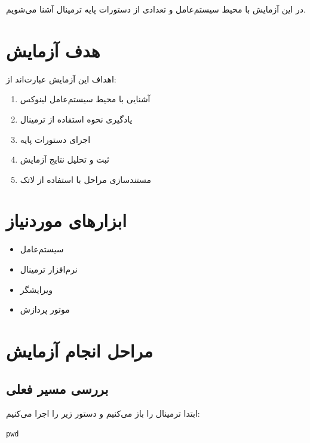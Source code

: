 \documentclass[12pt,a4paper]{article}
\begin{document}
در این آزمایش با محیط سیستم‌عامل
و تعدادی از دستورات پایه ترمینال آشنا می‌شویم.

\section{هدف آزمایش}

اهداف این آزمایش عبارت‌اند از:

\begin{enumerate}
    \item آشنایی با محیط سیستم‌عامل لینوکس
    \item یادگیری نحوه استفاده از ترمینال
    \item اجرای دستورات پایه
    \item ثبت و تحلیل نتایج آزمایش
    \item مستندسازی مراحل با استفاده از لاتک
\end{enumerate}

\section{ابزارهای موردنیاز}

\begin{itemize}
    \item سیستم‌عامل 
    \item نرم‌افزار ترمینال
    \item ویرایشگر 
    \item موتور پردازش 
\end{itemize}

\section{مراحل انجام آزمایش}

\subsection{بررسی مسیر فعلی}

ابتدا ترمینال را باز می‌کنیم و دستور زیر را اجرا می‌کنیم:

\begin{latin}
\begin{lstlisting}
pwd
\end{lstlisting}
\end{latin}
\end{document}

